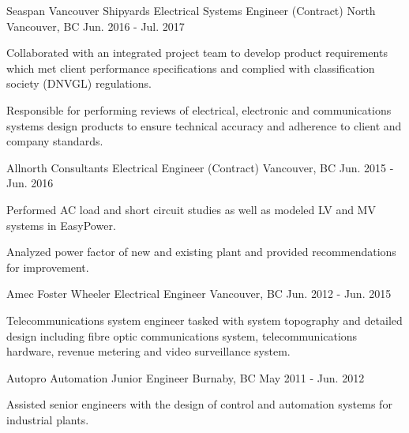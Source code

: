 \begin{cventries}
    \cventry
    {Seaspan Vancouver Shipyards} %
    {Electrical Systems Engineer (Contract)} %
    {North Vancouver, BC} %
    {Jun. 2016 - Jul. 2017} %
    { %
        \begin{cvitems}
            \item {Collaborated with an integrated project team to develop product requirements which met client performance specifications and complied with classification society (DNVGL) regulations.}
            \item {Responsible for performing reviews of electrical, electronic and communications systems design products to ensure technical accuracy and adherence to client and company standards.}
        \end{cvitems}
    \vspace{5mm}
    }

    \cventry
    {Allnorth Consultants} %
    {Electrical Engineer (Contract)} %
    {Vancouver, BC} %
    {Jun. 2015 - Jun. 2016} %
    { %
        \begin{cvitems}
            \item {Performed AC load and short circuit studies as well as modeled LV and MV systems in EasyPower.}
            \item{Analyzed power factor of new and existing plant and provided recommendations for improvement.}
        \end{cvitems}
    \vspace{5mm}
    }

    \cventry
    {Amec Foster Wheeler} %
    {Electrical Engineer} %
    {Vancouver, BC} %
    {Jun. 2012 - Jun. 2015} %
    { %
        \begin{cvitems}
            \item {Telecommunications system engineer tasked with system topography and detailed design including fibre optic communications system, telecommunications hardware, revenue metering and video surveillance system.}
        \end{cvitems}
    \vspace{5mm}
    }

    \cventry
    {Autopro Automation} %
    {Junior Engineer} %
    {Burnaby, BC} %
    {May 2011 - Jun. 2012} %
    { %
        \begin{cvitems}
            \item {Assisted senior engineers with the design of control and automation systems for industrial plants.}
        \end{cvitems}
    \vspace{5mm}
    }
\end{cventries}
